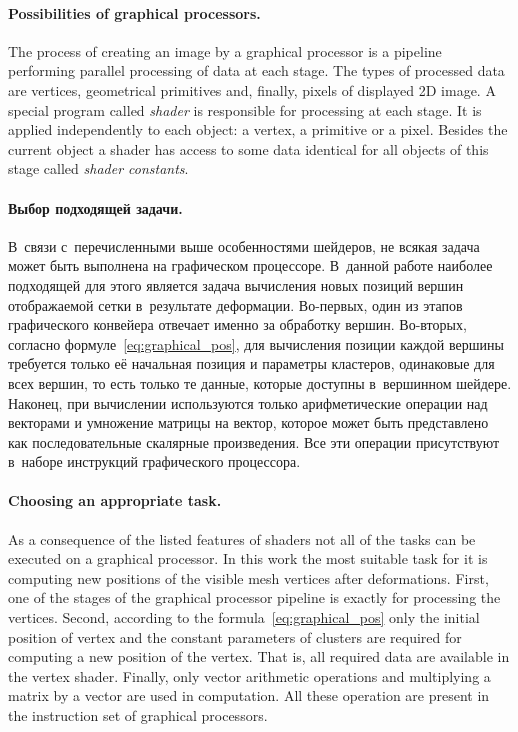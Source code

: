 \documentclass[a4paper, 12pt, titlepage]{extarticle}
\begin{document}
        \paragraph{Possibilities of graphical processors.}
        The process of creating an image by a graphical processor is a pipeline performing parallel
        processing of data at each stage. The types of processed data are vertices, geometrical primitives
        and, finally, pixels of displayed 2D image. A special program called \emph{shader} is
        responsible for processing at each stage. It is applied independently to each object: a
        vertex, a primitive or a pixel. Besides the current object a shader has access to some data
        identical for all objects of this stage called \emph{shader constants}.

\begin{original}
        \paragraph{Выбор подходящей задачи.}
        В~связи с~перечисленными выше особенностями шейдеров, не всякая задача может быть выполнена
        на графическом процессоре. В~данной работе наиболее подходящей для этого является задача
        вычисления новых позиций вершин отображаемой сетки в~результате деформации. Во-первых, один
        из этапов графического конвейера отвечает именно за обработку вершин. Во-вторых, согласно
        формуле~\eqref{eq:graphical_pos}, для вычисления позиции каждой вершины требуется только её
        начальная позиция и параметры кластеров, одинаковые для всех вершин, то есть только те
        данные, которые доступны в~вершинном шейдере. Наконец, при вычислении используются только
        арифметические операции над векторами и умножение матрицы на вектор, которое может быть
        представлено как последовательные скалярные произведения. Все эти операции присутствуют
        в~наборе инструкций графического процессора.
\end{original}

        \paragraph{Choosing an appropriate task.}
        As a consequence of the listed features of shaders not all of the tasks can be executed on
        a graphical processor. In this work the most suitable task for it is computing new positions
        of the visible mesh vertices after deformations. First, one of the stages of the graphical
        processor pipeline is exactly for processing the vertices. Second, according to the
        formula~\eqref{eq:graphical_pos} only the initial position of vertex and the constant parameters of
        clusters are required for computing a new position of the vertex. That is, all required data
        are available in the vertex shader. Finally, only vector arithmetic operations and multiplying
        a matrix by a vector are used in computation. All these operation are present in the
        instruction set of graphical processors.
\end{document}
